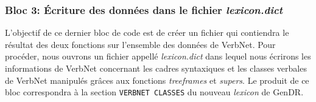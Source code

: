\subsubsection{Bloc 3: Écriture des données dans le fichier \emph{lexicon.dict}}

L'objectif de ce dernier bloc de code est de créer un fichier qui contiendra le résultat des deux fonctions sur l'ensemble des données de VerbNet. Pour procéder, nous ouvrons un fichier appellé \emph{lexicon.dict} dans lequel nous écrirons les informations de VerbNet concernant les cadres syntaxiques et les classes verbales de VerbNet manipulés grâces aux fonctions \emph{treeframes} et \emph{supers}. Le produit de ce bloc correspondra à la section \texttt{VERBNET CLASSES} du nouveau \emph{lexicon} de GenDR.


